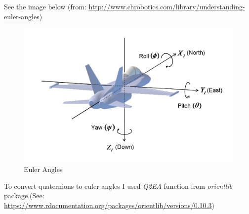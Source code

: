 \documentclass[]{article}
\begin{document}
See the image below (from:
\url{http://www.chrobotics.com/library/understanding-euler-angles})

\begin{figure}
\includegraphics[width=0.6\linewidth]{image_euler_angles} \caption{Euler Angles}\label{fig:euler angles image}
\end{figure}

To convert quaternions to euler angles I used \emph{Q2EA} function from
\emph{orientlib} package.(See:
\url{https://www.rdocumentation.org/packages/orientlib/versions/0.10.3})
\end{document}
